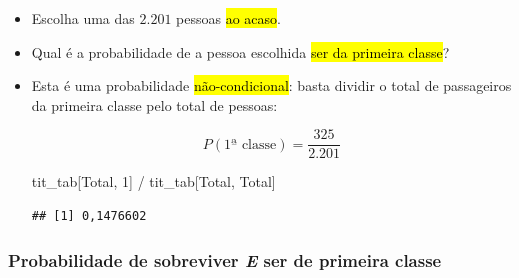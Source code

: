 \documentclass[
  11pt]{report}
\newenvironment{Shaded}{\begin{snugshade}}{\end{snugshade}}
\newcommand{\NormalTok}[1]{#1}
\newcommand{\SpecialCharTok}[1]{\textcolor[rgb]{0.00,0.00,0.00}{#1}}
\newcommand{\StringTok}[1]{\textcolor[rgb]{0.31,0.60,0.02}{#1}}
\renewenvironment{Shaded}{
    \begin{mdframed}[%
      roundcorner=2pt,%
      innerleftmargin=5pt,%
      innerrightmargin=5pt,%
      topline=true,%
      leftline=true,%
      rightline=true,%
      bottomline=true,%
      linewidth=0.5pt,%
      linecolor=black!20,%
      backgroundcolor=black!2,%
      skipabove=2ex,%
      skipbelow=2.5ex%
    ]%
  }
  {
    \end{mdframed}
  }
\begin{document}
\begin{itemize}
\item
  Escolha uma das $2.201$ pessoas {\hl{ao acaso}}.
\item
  Qual é a probabilidade de a pessoa escolhida {\hl{ser da primeira classe}}?
\item
  Esta é uma probabilidade {\hl{não-condicional}}: basta dividir o total de passageiros da primeira classe pelo total de pessoas:

  \[
  P(\text{1ª classe}) = 
  \frac
  {325}
  {2.201}
  \]

\begin{Shaded}
\begin{Highlighting}[]
\NormalTok{tit\_tab[}\StringTok{\textquotesingle{}Total\textquotesingle{}}\NormalTok{, }\StringTok{\textquotesingle{}1\textquotesingle{}}\NormalTok{] }\SpecialCharTok{/}\NormalTok{ tit\_tab[}\StringTok{\textquotesingle{}Total\textquotesingle{}}\NormalTok{, }\StringTok{\textquotesingle{}Total\textquotesingle{}}\NormalTok{]}
\end{Highlighting}
\end{Shaded}

\begin{verbatim}
## [1] 0,1476602
\end{verbatim}
\end{itemize}

\hypertarget{probabilidade-de-sobreviver-e-ser-de-primeira-classe}{%
\subsubsection*{\texorpdfstring{Probabilidade de sobreviver \emph{E} ser de primeira classe}{Probabilidade de sobreviver E ser de primeira classe}}\label{probabilidade-de-sobreviver-e-ser-de-primeira-classe}}
\end{document}

